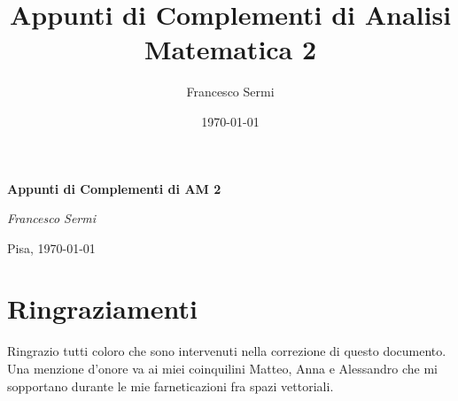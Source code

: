 \documentclass[openany, italian]{book}
\title{Appunti di Complementi di Analisi Matematica 2}
\author{Francesco Sermi}
\date{\today}
\begin{document}
	\begin{titlepage}
	\centering
	\vspace*{3cm}
	{\huge\bfseries Appunti di Complementi di AM 2 \par}
	\vspace{2cm}
	{\Large\itshape Francesco Sermi\par}
	\vfill
	\vfill	
	{\large \hfill Pisa, \today \par}
	\end{titlepage}
	\tableofcontents
	\chapter*{Ringraziamenti}
	Ringrazio tutti coloro che sono intervenuti nella correzione di questo documento. Una menzione d'onore va ai miei coinquilini Matteo, Anna e Alessandro che mi sopportano durante le mie farneticazioni fra spazi vettoriali.
	
\end{document}
